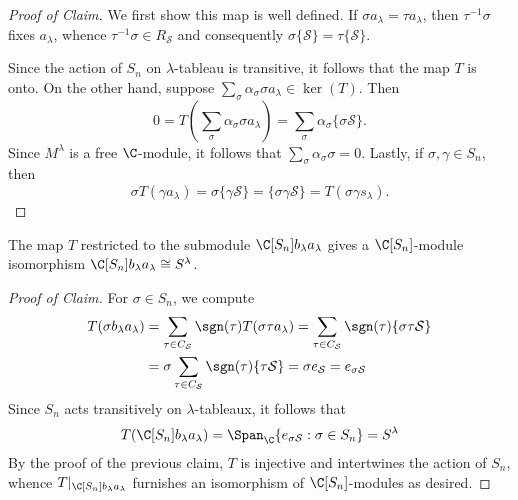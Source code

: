 \documentclass[../main.tex]{subfiles}
\begin{document}
\begin{proof}[Proof of Claim]
  We first show this map is well defined. If $ \sigma a_{\lambda} = \tau a_{\lambda} $, then $ \tau^{-1}\sigma $ fixes $ a_{\lambda} $, whence $ \tau^{-1} \sigma \in R_{\mathcal{S}} $ and consequently $ \sigma \{\mathcal{S}\} = \tau\{\mathcal{S}\}$.

  Since the action of $ S_{n} $ on $ \lambda $-tableau is transitive, it follows that the map $ T $ is onto. On the other hand, suppose $ \sum_{\sigma} \alpha_{\sigma}\sigma a_{\lambda} \in \ker(T) $. Then
  \[
    0 = T(\sum_{\sigma} \alpha_{\sigma} \sigma a_{\lambda}) = \sum_{\sigma} \alpha_{\sigma} \{\sigma \mathcal{S}\}.
  \]
  Since $ M^{\lambda} $ is a free $ \C $-module, it follows that $ \sum_{\sigma} \alpha_{\sigma} \sigma = 0 $. Lastly, if $ \sigma, \gamma\in S_{n} $, then
  \[
    \sigma T(\gamma a_{\lambda}) = \sigma\{\gamma \mathcal{S}\} = \{\sigma \gamma \mathcal{S}\} = T(\sigma \gamma s_{\lambda}).
  \]

\end{proof}

\begin{claim}
  The map $ T $ restricted to the submodule $ \C[S_{n}]b_{\lambda} a_{\lambda} $ gives a $ \C[S_{n}] $-module isomorphism $\C[S_{n}]b_{\lambda} a_{\lambda}\cong S^{\lambda} $.
\end{claim}

\begin{proof}[Proof of Claim]
  For $ \sigma\in S_{n} $, we compute
  \begin{align*}
    T(\sigma b_{\lambda} a_{\lambda}) &= \sum_{\tau\in C_{\mathcal{S}}} \sgn(\tau) T(\sigma \tau a_{\lambda}) =  \sum_{\tau\in C_{\mathcal{S}}} \sgn(\tau) \{\sigma \tau \mathcal{S}\} \\
    &= \sigma\sum_{\tau\in C_{\mathcal{S}}} \sgn(\tau) \{\tau \mathcal{S}\} = \sigma e_{\mathcal{S}} = e_{\sigma \mathcal{S}}\\
  \end{align*}
  Since $ S_{n} $ acts transitively on $ \lambda $-tableaux, it follows that
  \[
    T(\C[S_{n}]b_{\lambda}a_{\lambda}) = \Span_{\C}\{e_{\sigma \mathcal{S}}: \sigma\in S_{n}\} = S^{\lambda}
  \]
  By the proof of the previous claim, $ T $ is injective and intertwines the action of $ S_{n} $, whence $ T\vert_{\C[S_{n}]b_{\lambda}a_{\lambda}} $ furnishes an isomorphism of $ \C[S_{n}] $-modules as desired.
\end{proof}
\end{document}
